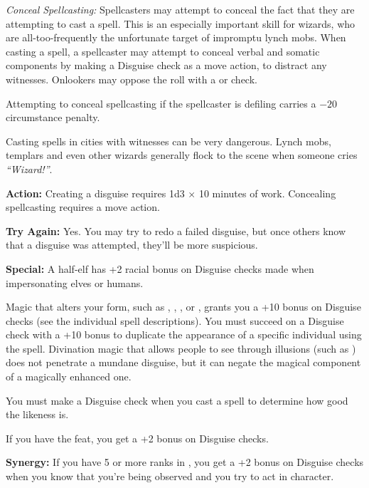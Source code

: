 \textit{Conceal Spellcasting:} Spellcasters may attempt to conceal the fact that they are attempting to cast a spell. This is an especially important skill for wizards, who are all-too-frequently the unfortunate target of impromptu lynch mobs. When casting a spell, a spellcaster may attempt to conceal verbal and somatic components by making a Disguise check as a move action, to distract any witnesses. Onlookers may oppose the roll with a  or  check.

Attempting to conceal spellcasting if the spellcaster is defiling carries a $-20$ circumstance penalty.


Casting spells in cities with witnesses can be very dangerous. Lynch mobs, templars and even other wizards generally flock to the scene when someone cries \textit{``Wizard!''}.

\textbf{Action:} Creating a disguise requires 1d3 $\times$ 10 minutes of work. Concealing spellcasting requires a move action.

\textbf{Try Again:} Yes. You may try to redo a failed disguise, but once others know that a disguise was attempted, they'll be more suspicious.

\textbf{Special:} A half-elf has +2 racial bonus on Disguise checks made when impersonating elves or humans.

Magic that alters your form, such as , , , or , grants you a +10 bonus on Disguise checks (see the individual spell descriptions). You must succeed on a Disguise check with a +10 bonus to duplicate the appearance of a specific individual using the  spell. Divination magic that allows people to see through illusions (such as ) does not penetrate a mundane disguise, but it can negate the magical component of a magically enhanced one.

You must make a Disguise check when you cast a  spell to determine how good the likeness is.

If you have the  feat, you get a +2 bonus on Disguise checks.

\textbf{Synergy:} If you have 5 or more ranks in , you get a +2 bonus on Disguise checks when you know that you're being observed and you try to act in character.